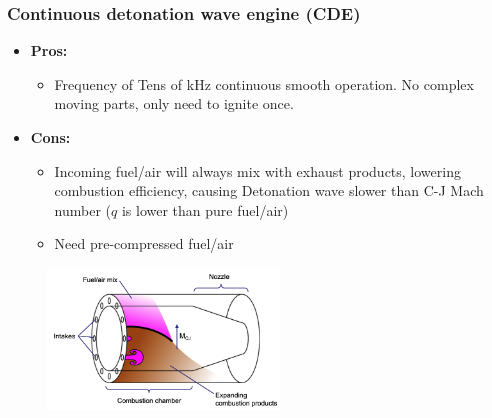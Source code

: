 \documentclass[a4paper,10pt]{article}
\begin{document}
\subsubsection*{Continuous detonation wave engine (CDE)}
\begin{multicols}{2}
    \begin{itemize}
        \item \textbf{Pros:}
            \begin{itemize}
                \item Frequency of Tens of kHz continuous smooth operation. No complex moving parts, only need to ignite once. 
            \end{itemize}
        \item \textbf{Cons:}
            \begin{itemize}
                \item Incoming fuel/air will always mix with exhaust products, lowering combustion efficiency, causing Detonation wave slower than C-J Mach number ($q$ is lower than pure fuel/air)
                \item Need pre-compressed fuel/air
            \end{itemize}
    \end{itemize}
    \begin{figure}[H]
        \centering
        \includegraphics[width=0.55\textwidth]{Figure/CDE.png}
    \end{figure}
\end{multicols}
\end{document}
